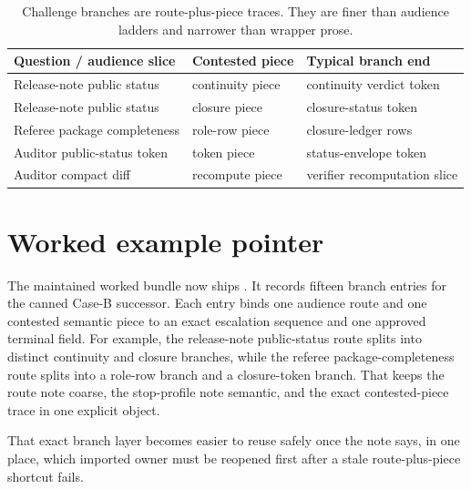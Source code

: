 \documentclass[11pt]{article}
\begin{document}
\begin{table}[t]
\centering
\small
\begin{tabularx}{\linewidth}{@{}l X X@{}}
\toprule
Question / audience slice & Contested piece & Typical branch end \\
\midrule
Release-note public status & continuity piece & continuity verdict token \\
Release-note public status & closure piece & closure-status token \\
Referee package completeness & role-row piece & closure-ledger rows \\
Auditor public-status token & token piece & status-envelope token \\
Auditor compact diff & recompute piece & verifier recomputation slice \\
\bottomrule
\end{tabularx}
\caption{Challenge branches are route-plus-piece traces. They are finer than audience ladders and narrower than wrapper prose.}
\label{tab:branchmap}
\end{table}

\section{Worked example pointer}
The maintained worked bundle now ships .\cite{series:workedexample}
It records fifteen branch entries for the canned Case-B successor.
Each entry binds one audience route and one contested semantic piece to an exact escalation sequence and one approved terminal field.
For example, the release-note public-status route splits into distinct continuity and closure branches, while the referee package-completeness route splits into a role-row branch and a closure-token branch.
That keeps the route note coarse, the stop-profile note semantic, and the exact contested-piece trace in one explicit object.\cite{series:challengeroutes,series:challengestops}

\noindent That exact branch layer becomes easier to reuse safely once the note says, in one place, which imported owner must be reopened first after a stale route-plus-piece shortcut fails.
\end{document}
